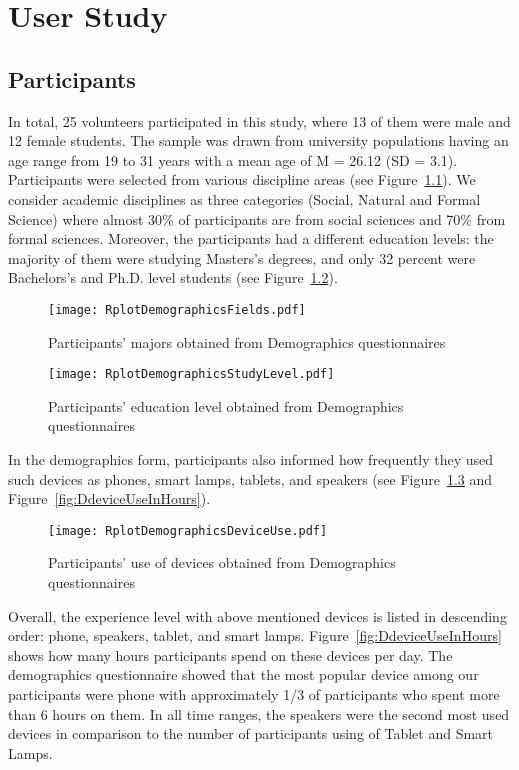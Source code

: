 \chapter{User Study}
\label{ch:user-study}

\section{Participants}
In total, 25 volunteers participated in this study, where 13 of them were male and 12 female students. The sample was drawn from university populations having an age range from 19 to 31 years with a mean age of M = 26.12 (SD = 3.1). Participants were selected from various discipline areas (see Figure~\ref{fig:Dfields}). We consider academic disciplines as three categories (Social, Natural and Formal Science) where almost 30\% of participants are from social sciences and 70\% from formal sciences. Moreover, the participants had a different education levels: the majority of them were studying Masters’s degrees, and only 32 percent were Bachelors’s and Ph.D. level students (see Figure~\ref{fig:DstudyLevels}).

\begin{figure}[H]
  \centering
    \texttt{[image: RplotDemographicsFields.pdf]}
      \caption{Participants' majors obtained from Demographics questionnaires}
      \label{fig:Dfields}
\end{figure}

\begin{figure}[H]
  \centering
    \texttt{[image: RplotDemographicsStudyLevel.pdf]}
      \caption{Participants' education level obtained from Demographics questionnaires}
      \label{fig:DstudyLevels}
\end{figure}

In the demographics form, participants also informed how frequently they used such devices as phones, smart lamps, tablets, and speakers (see Figure~\ref{fig:DdeviceUse} and Figure~\ref{fig:DdeviceUseInHours}). 

\begin{figure}[H]
  \centering
    \texttt{[image: RplotDemographicsDeviceUse.pdf]}
      \caption{Participants' use of devices obtained from Demographics questionnaires}
      \label{fig:DdeviceUse}
\end{figure}

Overall, the experience level with above mentioned devices is listed in descending order: phone, speakers, tablet, and smart lamps. Figure~\ref{fig:DdeviceUseInHours} shows how many hours participants spend on these devices per day. The demographics questionnaire showed that the most popular device among our participants were phone with approximately 1/3 of participants who spent more than 6 hours on them. In all time ranges, the speakers were the second most used devices in comparison to the number of participants using of Tablet and Smart Lamps. 

